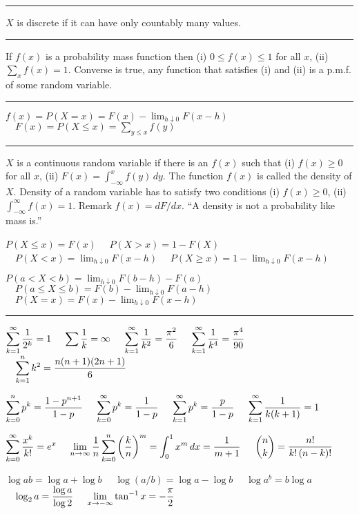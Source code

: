 \documentclass[10pt]{article}
\begin{document}
\begin{plain}
\smallskip
\hrule

\smallskip
$X$ is discrete if it can have only countably many values.

\smallskip
\hrule

\smallskip
If $f(x)$ is a probability mass function then
(i) $0\le f(x)\le 1$ for all $x$,
(ii) $\sum_xf(x)=1$.
Converse is true, any function that satisfies (i) and (ii) is a
p.m.f. of some random variable.

\smallskip
\hrule

\smallskip
$f(x)=P(X=x)=F(x)-\lim_{h\downarrow0}F(x-h)$
$\quad F(x)=P(X\le x)=\sum_{y\le x}f(y)$

\smallskip
\hrule

\smallskip
$X$ is a continuous random variable if there is an $f(x)$ such that
(i) $f(x)\ge0$ for all $x$,
(ii) $\displaystyle F(x)=\int_{-\infty}^x f(y)\,dy$.
The function $f(x)$ is called the density of $X$.
Density of a random variable has to satisfy two conditions
(i) $f(x)\ge 0$,
(ii) $\displaystyle\int_{-\infty}^\infty f(x)=1$.
Remark $f(x)=dF/dx$.
``A density is not a probability like mass is.''

\vfill
\eject

$P(X\le x)=F(x)$
$\quad P(X>x)=1-F(X)$
$\quad \displaystyle P(X<x)=\lim_{h\downarrow0}F(x-h)$
$\quad\displaystyle P(X\ge x)=1-\lim_{h\downarrow0}F(x-h)$

\smallskip
$\displaystyle P(a<X<b)=\lim_{h\downarrow0}F(b-h)-F(a)$
$\quad\displaystyle P(a\le X\le b)=F(b)-\lim_{h\downarrow0}F(a-h)$
$\quad\displaystyle P(X=x)=F(x)-\lim_{h\downarrow0}F(x-h)$

\smallskip
\hrule

\smallskip
$\displaystyle\sum_{k=1}^\infty{1\over2^k}=1$
$\quad\displaystyle\sum{1\over k}=\infty$
$\quad\displaystyle\sum_{k=1}^\infty{1\over k^2}={\pi^2\over6}$
$\quad\displaystyle\sum_{k=1}^\infty{1\over k^4}={\pi^4\over90}$
$\quad\displaystyle\sum_{k=1}^nk^2={n(n+1)(2n+1)\over6}$

\smallskip
$\displaystyle\sum_{k=0}^np^k={1-p^{n+1}\over1-p}$
$\quad\displaystyle\sum_{k=0}^\infty p^k={1\over1-p}$
$\quad\displaystyle\sum_{k=1}^\infty p^k={p\over1-p}$
$\quad\displaystyle\sum_{k=1}^\infty{1\over k(k+1)}=1$

\smallskip
$\displaystyle\sum_{k=0}^\infty{x^k\over k!}=e^x$
$\quad\displaystyle\lim_{n\to\infty}{1\over n}
\sum_{k=0}^n\left({k\over n}\right)^m
=\int_0^1x^m\,dx={1\over m+1}$
$\quad\displaystyle{n\choose k}={n!\over k!\,(n-k)!}$

\smallskip
$\log ab=\log a+\log b$
$\quad\log(a/b)=\log a-\log b$
$\quad\log a^b=b\log a$
$\quad\displaystyle\log_2 a={\log a\over\log 2}$
$\quad\displaystyle\lim_{x\to-\infty}\tan^{-1}x=-{\pi\over2}$


\end{plain}
\end{document}
